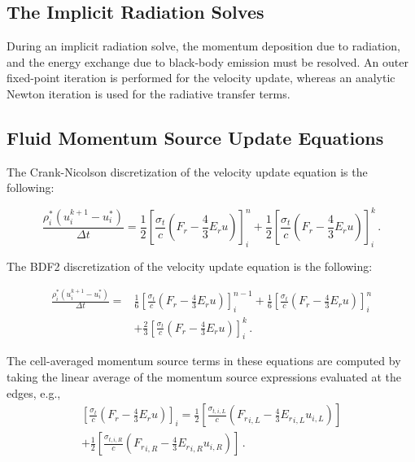 \documentclass[preprint,12pt]{elsarticle}
\newcommand{\pep}{\, .}
\newcommand{\lequ}[1]{\label{eq:#1}}
\newcommand{\half}{\frac{1}{2}}
\newcommand{\sixth}{\frac{1}{6}}
\newcommand{\E}{{E_r}}
\newcommand{\F}{{F_r}}
\newcommand{\dt}{\Delta t}
\newcommand{\iL}{_{i,L}}
\newcommand{\iR}{_{i,R}}
\newcommand{\momentumSource}{
   \left[\frac{\sigma_{t}}{c}\left(\F-\frac{4}{3}\E u\right)\right]
}
\newcommand{\momentumUpdateCN}[4]{
\begin{equation}
  \frac{\rho^*#3\left(u^{k+1}#3-u^*#3\right)}{#2\dt} = 
   \half\momentumSource^{#1}#3
  +\half\momentumSource^k#3
  \pep
#4
\end{equation}
}
\newcommand{\momentumUpdateBDFTwo}[5]{
\begin{equation}\begin{split}
  \frac{\rho^*#4\left(u^{k+1}#4-u^*#4\right)}{#3\dt} =  
  & \sixth\momentumSource^{#1}#4
   +\sixth\momentumSource^{#2}#4\\
  &+\frac{2}{3}\momentumSource^k#4
  \pep
#5
\end{split}\end{equation}
}
\begin{document}
\subsection{The Implicit Radiation Solves}

During an implicit radiation solve, the momentum deposition due to radiation, and the
energy exchange due to black-body emission must be resolved.  An outer fixed-point
iteration is performed for the velocity update, whereas an analytic Newton iteration is used for the 
radiative transfer terms.


\subsection{Fluid Momentum Source Update Equations}
The Crank-Nicolson discretization of the velocity update equation is the
following:
\momentumUpdateCN{n}{}{_i}{\lequ{hydromCNfull}}
The BDF2 discretization of the velocity update equation is the
following:
\momentumUpdateBDFTwo{n-1}{n}{}{_i}{\lequ{hydromBDF2full}}
The cell-averaged momentum source terms in these equations are computed by taking the linear
average of the momentum source expressions evaluated at the edges, e.g., 
\begin{multline}
   \left[\frac{\sigma_t}{c}\left(\F - \frac{4}{3}\E u\right)\right]_i =
   \half\left[\frac{\sigma_{t,i,L}}{c}\left(\F\iL - \frac{4}{3}\E\iL u\iL\right)\right]\\
   + \half\left[\frac{\sigma_{t,i,R}}{c}\left(\F\iR - \frac{4}{3}\E\iR u\iR\right)\right]
   \pep
\end{multline}

\end{document}
